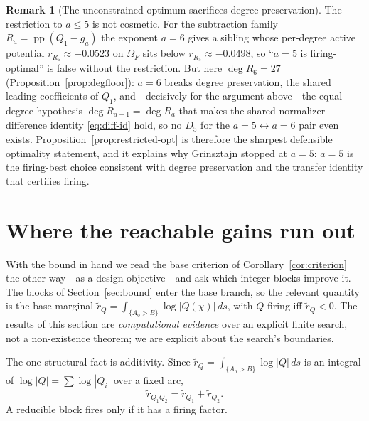 \documentclass[11pt,reqno]{amsart}
\theoremstyle{plain}
\theoremstyle{definition}
\newtheorem{remark}[theorem]{Remark}
\DeclareMathOperator{\pp}{pp}
\newcommand{\rb}[1]{r_{#1}}   %
\begin{document}
\begin{remark}[The unconstrained optimum sacrifices degree preservation]
\label{rem:a6}
The restriction to $a\le5$ is not cosmetic. For the subtraction family
$R_a=\pp(Q_1-g_a)$ the exponent $a=6$ gives a sibling whose per-degree active potential
$\rb{R_6}\approx-0.0523$ on $\Omega_F$ sits below $\rb{R_5}\approx-0.0498$, so ``$a=5$ is
firing-optimal'' is false without the restriction. But here
$\deg R_6=27$ (Proposition~\ref{prop:degfloor}): $a=6$ breaks degree preservation, the
shared leading coefficients of $Q_1$, and---decisively for the argument
above---the equal-degree hypothesis $\deg R_{a+1}=\deg R_a$ that makes the
shared-normalizer difference identity \eqref{eq:diff-id} hold, so no $D_5$ for the
$a=5\leftrightarrow a=6$ pair even exists. Proposition~\ref{prop:restricted-opt} is
therefore the sharpest defensible optimality statement, and it explains why Grinsztajn
stopped at $a=5$: $a=5$ is the firing-best choice consistent with degree preservation
and the transfer identity that certifies firing.
\end{remark}

\section{Where the reachable gains run out}\label{sec:saturation}

With the bound in hand we read the base criterion of
Corollary~\ref{cor:criterion} the other way---as a design objective---and ask which
integer blocks improve it. The blocks of Section~\ref{sec:bound} enter the base branch,
so the relevant quantity is the base marginal
$\widetilde r_Q=\int_{\{A_0>B\}}\log|Q(\chi)|\,ds$, with $Q$ firing iff
$\widetilde r_Q<0$. The results of this section are \emph{computational evidence} over
an explicit finite search, not a non-existence theorem; we are explicit about the
search's boundaries.

The one structural fact is additivity. Since
$\widetilde r_Q=\int_{\{A_0>B\}}\log|Q|\,ds$ is an integral of $\log|Q|=\sum\log|Q_i|$
over a fixed arc,
\begin{equation}\label{eq:additive}
  \widetilde r_{Q_1Q_2}=\widetilde r_{Q_1}+\widetilde r_{Q_2}.
\end{equation}
A reducible block fires only if it has a firing factor.
\end{document}

